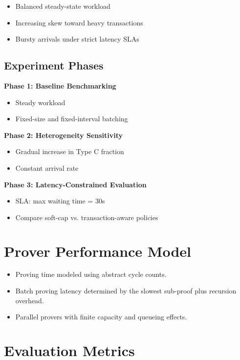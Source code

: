\documentclass[11pt]{article}
\begin{document}
\begin{itemize}[leftmargin=1.5em]
    \item Balanced steady-state workload
    \item Increasing skew toward heavy transactions
    \item Bursty arrivals under strict latency SLAs
\end{itemize}

\subsection{Experiment Phases}

\textbf{Phase 1: Baseline Benchmarking}
\begin{itemize}
    \item Steady workload
    \item Fixed-size and fixed-interval batching
\end{itemize}

\textbf{Phase 2: Heterogeneity Sensitivity}
\begin{itemize}
    \item Gradual increase in Type C fraction
    \item Constant arrival rate
\end{itemize}

\textbf{Phase 3: Latency-Constrained Evaluation}
\begin{itemize}
    \item SLA: max waiting time = 30s
    \item Compare soft-cap vs. transaction-aware policies
\end{itemize}

\section{Prover Performance Model}

\begin{itemize}[leftmargin=1.5em]
    \item Proving time modeled using abstract cycle counts.
    \item Batch proving latency determined by the slowest sub-proof plus recursion overhead.
    \item Parallel provers with finite capacity and queueing effects.
\end{itemize}

\section{Evaluation Metrics}
\end{document}
